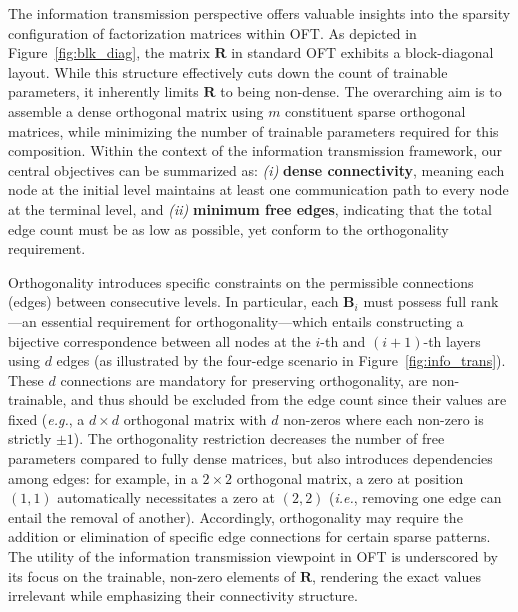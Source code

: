 The information transmission perspective offers valuable insights into the sparsity configuration of factorization matrices within OFT. As depicted in Figure~\ref{fig:blk_diag}, the matrix $\bm{R}$ in standard OFT exhibits a block-diagonal layout. While this structure effectively cuts down the count of trainable parameters, it inherently limits $\bm{R}$ to being non-dense. The overarching aim is to assemble a dense orthogonal matrix using $m$ constituent sparse orthogonal matrices, while minimizing the number of trainable parameters required for this composition. Within the context of the information transmission framework, our central objectives can be summarized as: \emph{(i)} \textbf{dense connectivity}, meaning each node at the initial level maintains at least one communication path to every node at the terminal level, and \emph{(ii)} \textbf{minimum free edges}, indicating that the total edge count must be as low as possible, yet conform to the orthogonality requirement. 

Orthogonality introduces specific constraints on the permissible connections (edges) between consecutive levels. In particular, each $\bm{B}_i$ must possess full rank—an essential requirement for orthogonality—which entails constructing a bijective correspondence between all nodes at the $i$-th and $(i+1)$-th layers using $d$ edges (as illustrated by the four-edge scenario in Figure~\ref{fig:info_trans}). These $d$ connections are mandatory for preserving orthogonality, are non-trainable, and thus should be excluded from the edge count since their values are fixed (\emph{e.g.}, a $d\times d$ orthogonal matrix with $d$ non-zeros where each non-zero is strictly $\pm 1$). The orthogonality restriction decreases the number of free parameters compared to fully dense matrices, but also introduces dependencies among edges: for example, in a $2\times 2$ orthogonal matrix, a zero at position $(1,1)$ automatically necessitates a zero at $(2,2)$ (\emph{i.e.}, removing one edge can entail the removal of another). Accordingly, orthogonality may require the addition or elimination of specific edge connections for certain sparse patterns. The utility of the information transmission viewpoint in OFT is underscored by its focus on the trainable, non-zero elements of $\bm{R}$, rendering the exact values irrelevant while emphasizing their connectivity structure.

